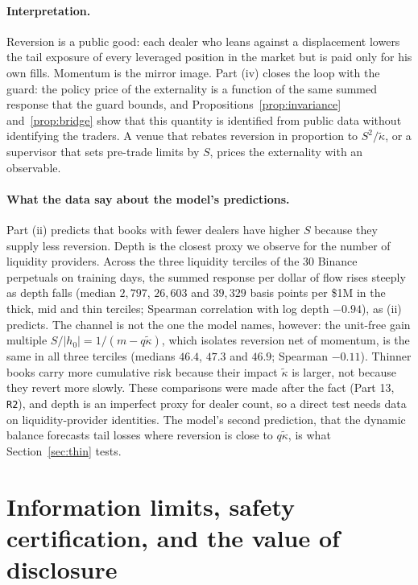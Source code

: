 \paragraph{Interpretation.} Reversion is a public good: each dealer who leans against a displacement lowers the tail exposure of every leveraged position in the market but is paid only for his own fills. Momentum is the mirror image. Part (iv) closes the loop with the guard: the policy price of the externality is a function of the same summed response that the guard bounds, and Propositions~\ref{prop:invariance} and~\ref{prop:bridge} show that this quantity is identified from public data without identifying the traders. A venue that rebates reversion in proportion to $S^2/\tilde\kappa$, or a supervisor that sets pre-trade limits by $S$, prices the externality with an observable.

\paragraph{What the data say about the model's predictions.} Part (ii) predicts that books with fewer dealers have higher $S$ because they supply less reversion. Depth is the closest proxy we observe for the number of liquidity providers. Across the three liquidity terciles of the 30 Binance perpetuals on training days, the summed response per dollar of flow rises steeply as depth falls (median $2{,}797$, $26{,}603$ and $39{,}329$ basis points per \$1M in the thick, mid and thin terciles; Spearman correlation with log depth $-0.94$), as (ii) predicts. The channel is not the one the model names, however: the unit-free gain multiple $S/|h_0|=1/(m-q\tilde\kappa)$, which isolates reversion net of momentum, is the same in all three terciles (medians $46.4$, $47.3$ and $46.9$; Spearman $-0.11$). Thinner books carry more cumulative risk because their impact $\tilde\kappa$ is larger, not because they revert more slowly. These comparisons were made after the fact (Part 13, \texttt{R2}), and depth is an imperfect proxy for dealer count, so a direct test needs data on liquidity-provider identities. The model's second prediction, that the dynamic balance forecasts tail losses where reversion is close to $q\tilde\kappa$, is what Section~\ref{sec:thin} tests.

\section{Information limits, safety certification, and the value of disclosure}\label{sec:flagship}

